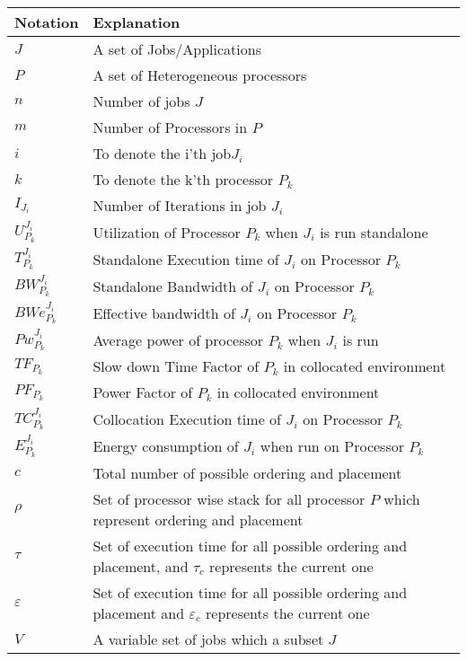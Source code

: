 \begin{table}[]
\small
\centering
\begin{tabular}{| P{1cm} | p{6.5cm} |}
\hline
    \textbf{Notation} & \textbf{Explanation}  \\ \hline 
$J$ &  A set of Jobs/Applications \\ \hline
$P$ & 	A set of Heterogeneous processors	 \\  \hline
$n$ & 	Number of jobs $J$	 \\  \hline
$m$ & 	Number of Processors in $P$	\\  \hline
$i$ & 	To denote the i'th job$J_i$	\\  \hline
$k$ & 	To denote the k'th processor $P_k$	 \\  \hline
$I_{J_i}$ & Number of Iterations in job $J_i$\\  \hline
$U_{P_k}^{J_i}$ & Utilization of Processor $P_k$ when $J_i$ is run standalone	 \\  \hline
$T_{P_k}^{J_i}$ & Standalone Execution time of $J_i$ on Processor $P_k$ \\  \hline
$BW_{P_k}^{J_i}$ & Standalone Bandwidth of $J_i$ on Processor $P_k$ \\  \hline
$BWe_{P_k}^{J_i}$ & Effective bandwidth of $J_i$ on Processor $P_k$  \\  \hline
$Pw_{P_k}^{J_i}$ & Average power of processor $P_k$ when $J_i$ is run \\  \hline
$TF_{P_k}$ & Slow down Time Factor of  $P_k$ in collocated environment \\  \hline
$PF_{P_k}$ & Power Factor of  $P_k$ in collocated environment \\  \hline
$TC_{P_k}^{J_i}$ & Collocation Execution time of $J_i$ on Processor $P_k$ \\  \hline
$E_{P_k}^{J_i}$ & Energy consumption of $J_i$ when run on Processor $P_k$ \\  \hline
$c$ & Total number of possible ordering and placement \\  \hline
$\rho$ & Set of processor wise stack for all processor $P$ which represent ordering and placement \\  \hline
$\tau$ & Set of execution time for all possible ordering and placement, and $\tau_c$ represents the current one \\  \hline
$\varepsilon$ & Set of execution time for all possible ordering and placement and $\varepsilon_c$ represents the current one\\  \hline
$V$ & A variable set of jobs which a subset $J$\\  \hline

\end{tabular}
\end{table}

